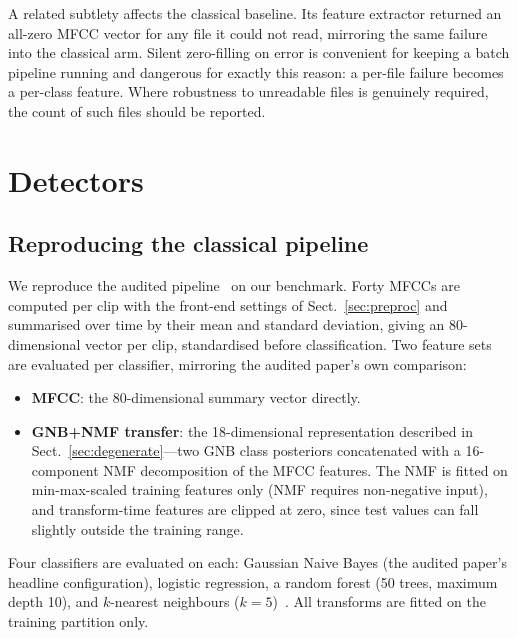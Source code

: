 \documentclass[sn-mathphys-num,pdflatex]{sn-jnl}
\begin{document}
A related subtlety affects the classical baseline. Its feature extractor
returned an all-zero MFCC vector for any file it could not read, mirroring the
same failure into the classical arm. Silent zero-filling on error is convenient
for keeping a batch pipeline running and dangerous for exactly this reason: a
per-file failure becomes a per-class feature. Where robustness to unreadable
files is genuinely required, the count of such files should be reported.

\section{Detectors}\label{sec:methods}

\subsection{Reproducing the classical pipeline}\label{sec:classical}

We reproduce the audited pipeline~\cite{unmasking} on our benchmark. Forty MFCCs
are computed per clip with the front-end settings of Sect.~\ref{sec:preproc} and
summarised over time by their mean and standard deviation, giving an
80-dimensional vector per clip, standardised before classification. Two feature
sets are evaluated per classifier, mirroring the audited paper's own comparison:

\begin{itemize}
\item \textbf{MFCC}: the 80-dimensional summary vector directly.
\item \textbf{GNB+NMF transfer}: the 18-dimensional representation described in
Sect.~\ref{sec:degenerate}---two GNB class posteriors concatenated with a
16-component NMF decomposition of the MFCC features. The NMF is fitted on
min-max-scaled training features only (NMF requires non-negative input), and
transform-time features are clipped at zero, since test values can fall slightly
outside the training range.
\end{itemize}

Four classifiers are evaluated on each: Gaussian Naive Bayes (the audited
paper's headline configuration), logistic regression, a random forest (50 trees,
maximum depth 10), and $k$-nearest neighbours ($k = 5$)~\cite{sklearn}. All
transforms are fitted on the training partition only.
\end{document}
